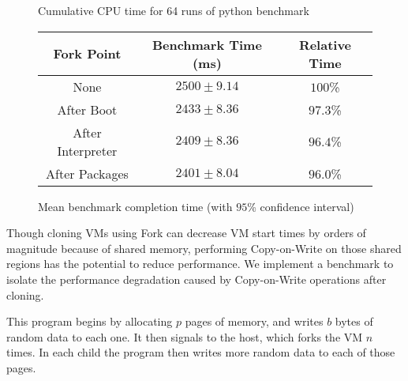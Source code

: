 \pgfplotsset{compat=1.5}
\begin{figure*}[t]
  \center
  \label{fig:pybench}
\caption{Cumulative CPU time for 64 runs of python benchmark}
\end{figure*}

\begin{figure*}
  \center
  \begin{tabular}{|c|c|c|}
    \hline
    Fork Point & Benchmark Time (ms) & Relative Time \\ \hline
    None & $2500 \pm 9.14$ & $100$\% \\ \hline
    After Boot & $2433 \pm 8.36$ & $97.3$\% \\ \hline
    After Interpreter & $2409 \pm 8.36$ & $96.4$\% \\ \hline
    After Packages & $2401 \pm 8.04$ & $96.0$\% \\ \hline
  \end{tabular}

  \caption{Mean benchmark completion time (with $95$\% confidence interval)}
\end{figure*}

Though cloning VMs using Fork can decrease VM start times by orders of
magnitude because of shared memory, performing Copy-on-Write on those shared
regions has the potential to reduce performance. We implement a benchmark to
isolate the performance degradation caused by Copy-on-Write operations after
cloning.

This program begins by allocating $p$ pages of memory, and writes $b$ bytes of
random data to each one. It then signals to the host, which forks the VM $n$
times. In each child the program then writes more random data to each of those
pages.

